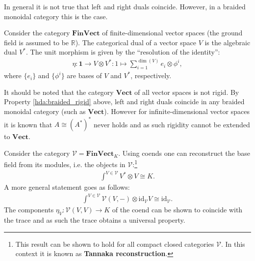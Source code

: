 
    \begin{property}\label{hda:braided_rigid}
        In general it is not true that left and right duals coincide. However, in a braided monoidal category this is the case.
    \end{property}

    \begin{example}[FinVect]
        Consider the category $\mathbf{FinVect}$ of finite-dimensional vector spaces (the ground field is assumed to be $\mathbb{R}$). The categorical dual of a vector space $V$ is the algebraic dual $V^*$. The unit morphism is given by the ``resolution of the identity'':
        \begin{gather}
            \eta:\mathbf{1}\rightarrow V\otimes V^*:1\mapsto\sum_{i=1}^{\dim(V)}e_i\otimes\phi^i,
        \end{gather}
        where $\{e_i\}$ and $\{\phi^i\}$ are bases of $V$ and $V^*$, respectively.

        It should be noted that the category $\mathbf{Vect}$ of all vector spaces is not rigid. By Property \ref{hda:braided_rigid} above, left and right duals coincide in any braided monoidal category (such as $\mathbf{Vect}$). However for infinite-dimensional vector spaces it is known that $A\cong(A^*)^*$ never holds and as such rigidity cannot be extended to $\mathbf{Vect}$.
    \end{example}
    \begin{property}
        Consider the category $\mathcal{V}=\mathbf{FinVect}_K$. Using coends one can reconstruct the base field from its modules, i.e. the objects in $\mathcal{V}$:\footnote{This result can be shown to hold for all compact closed categories $\mathcal{V}$. In this context it is known as \textbf{Tannaka reconstruction}.}
        \begin{gather}
            \int^{V\in\mathcal{V}}V^*\otimes V\cong K.
        \end{gather}
        A more general statement goes as follows:
        \begin{gather}
            \int^{V\in\mathcal{V}}\mathcal{V}(V, -)\otimes\text{id}_{\mathcal{V}}V\cong\text{id}_{\mathcal{V}}.
        \end{gather}
        The components $\eta_V:\mathcal{V}(V,V)\rightarrow K$ of the coend can be shown to coincide with the trace and as such the trace obtains a universal property.
    \end{property}

